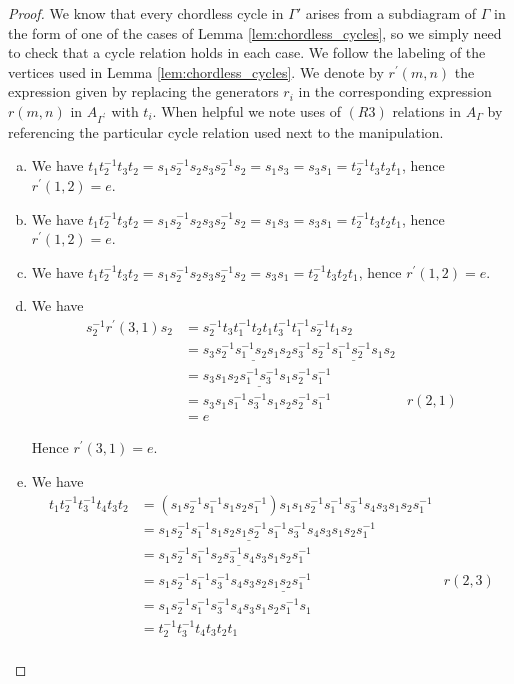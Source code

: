 \documentclass[11pt]{amsart}
\theoremstyle{definition}
\begin{document}
\begin{proof}
We know that every chordless cycle in $\Gamma'$ arises from a subdiagram of $\Gamma$ in the form of one of the cases of Lemma \ref{lem:chordless_cycles}, so we simply need to check that a cycle relation holds in each case.  We follow the labeling of the vertices used in Lemma \ref{lem:chordless_cycles}.  We denote by $r^\prime(m,n)$ the expression given by replacing the generators $r_i$ in the corresponding expression $r(m,n)$ in $A_{\Gamma^\prime}$ with $t_i$.  When helpful we note uses of $(R3)$ relations in $A_\Gamma$ by referencing the particular cycle relation used next to the manipulation.

\begin{enumerate}[a)]
\item We have $t_1t_2^{-1}t_3t_2 = s_1s_2^{-1}s_2s_3s_2^{-1}s_2 = s_1s_3 = s_3s_1 = t_2^{-1}t_3t_2t_1$, hence $r^\prime(1,2) = e$.

\item We have $ t_1t_2^{-1}t_3t_2 = s_1s_2^{-1}s_2s_3s_2^{-1}s_2 = s_1s_3 = s_3s_1 = t_2^{-1}t_3t_2t_1$, hence $r^\prime(1,2) = e$.

\item We have $t_1t_2^{-1}t_3t_2 = s_1s_2^{-1}s_2s_3s_2^{-1}s_2 = s_3s_1 = t_2^{-1}t_3t_2t_1$, hence $r^\prime(1,2) = e$.

\item We have
\begin{align*}
s_2^{-1}r^\prime(3,1)s_2 &= s_2^{-1}t_3t_1^{-1}t_2t_1t_3^{-1}t_1^{-1}s_2^{-1}t_1s_2\\
&= s_3\underline{s_2^{-1}s_1^{-1}s_2s_1s_2}s_3^{-1}\underline{s_2^{-1}s_1^{-1}s_2^{-1}s_1s_2}\\
&= s_3s_1\underline{s_2s_1^{-1}s_3^{-1}s_1}s_2^{-1}s_1^{-1}\\
&= s_3s_1s_1^{-1}s_3^{-1}s_1s_2s_2^{-1}s_1^{-1} &r(2,1)\\
&= e
\end{align*}

\noindent Hence $r^\prime(3,1) = e$.

\item We have
\begin{align*}
t_1t_2^{-1}t_3^{-1}t_4t_3t_2 &= (s_1s_2^{-1}s_1^{-1}s_1s_2s_1^{-1})s_1s_1s_2^{-1}s_1^{-1}s_3^{-1}s_4s_3s_1s_2s_1^{-1}\\
&= s_1s_2^{-1}s_1^{-1}\underline{s_1s_2s_1s_2^{-1}s_1^{-1}}s_3^{-1}s_4s_3s_1s_2s_1^{-1}\\
&= s_1s_2^{-1}s_1^{-1}\underline{s_2s_3^{-1}s_4s_3}s_1s_2s_1^{-1}\\
&= s_1s_2^{-1}s_1^{-1}s_3^{-1}s_4s_3\underline{s_2s_1s_2s_1^{-1}} &r(2,3)\\
&= s_1s_2^{-1}s_1^{-1}s_3^{-1}s_4s_3s_1s_2s_1^{-1}s_1\\
&= t_2^{-1}t_3^{-1}t_4t_3t_2t_1\\
\end{align*}


\end{enumerate}
\end{proof}
\end{document}
